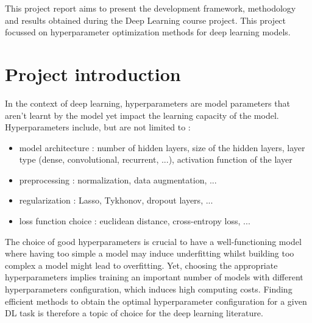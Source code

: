 \documentclass[a4 paper,11pt,2]{article}
\begin{document}

\thispagestyle{empty}

This project report aims to present the development framework, methodology and results obtained during the Deep Learning course project. This project focussed on hyperparameter optimization methods for deep learning models.

\section{Project introduction}
In the context of deep learning, hyperparameters  are model parameters that aren't learnt by the model yet impact the learning capacity of the model. Hyperparameters include, but are not limited to :
\begin{itemize}
\item model architecture : number of hidden layers, size of the hidden layers, layer type (dense, convolutional, recurrent, ...), activation function of the layer
\item preprocessing : normalization, data augmentation, ...
\item regularization : Lasso, Tykhonov, dropout layers, ...
\item loss function choice : euclidean distance, cross-entropy loss, ...
\end{itemize}

The choice of good hyperparameters is crucial to have a well-functioning model where having too simple a model may induce underfitting whilst building too complex a model might lead to overfitting. Yet, choosing the appropriate hyperparameters implies training an important number of models with different hyperparameters configuration, which induces high computing costs. Finding efficient methods to obtain the optimal hyperparameter configuration for a given DL task is therefore a topic of choice for the deep learning literature.
\end{document}
